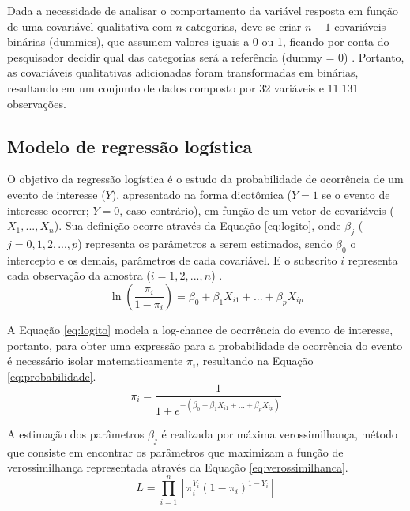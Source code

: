 \documentclass[twocolumn]{rbef}
\newcommand{\1}{\mathbbm{1}}
\begin{document}
Dada a necessidade de analisar o comportamento da variável resposta em função de uma covariável qualitativa com \(n\) categorias, deve-se criar \(n-1\) covariáveis binárias (dummies), que assumem valores iguais a 0 ou 1, ficando por conta do pesquisador decidir qual das categorias será a referência (dummy = 0) \cite{Favero2017}. Portanto, as covariáveis qualitativas adicionadas foram transformadas em binárias, resultando em um conjunto de dados composto por 32 variáveis e 11.131 observações.

\hypertarget{modelo-de-regressuxe3o-loguxedstica}{%
\subsection{Modelo de regressão logística}\label{modelo-de-regressuxe3o-loguxedstica}}

O objetivo da regressão logística é o estudo da probabilidade de ocorrência de um evento de interesse (\(Y\)), apresentado na forma dicotômica (\(Y=1\) se o evento de interesse ocorrer; \(Y=0\), caso contrário), em função de um vetor de covariáveis (\(X_1, ..., X_n\)). Sua definição ocorre através da Equação \eqref{eq:logito}, onde \(\beta_j\) (\(j = 0,1,2,...,p\)) representa os parâmetros a serem estimados, sendo \(\beta_0\) o intercepto e os demais, parâmetros de cada covariável. E o subscrito \(i\) representa cada observação da amostra (\(i = 1, 2,...,n\)) \cite{Favero2017}.
\begin{equation}
\ln \left ( \dfrac{\pi_i}{1-\pi_i} \right ) = \beta_0 + \beta_1 X_{i1} + ... +  \beta_p X_{ip}\label{eq:logito}
\end{equation}

A Equação \eqref{eq:logito} modela a log-chance de ocorrência do evento de interesse, portanto, para obter uma expressão para a probabilidade de ocorrência do evento é necessário isolar matematicamente \(\pi_i\), resultando na Equação \eqref{eq:probabilidade}.
\begin{equation}
\pi_i = \dfrac{1}{1 + e^{-(\beta_0 + \beta_1 X_{i1} + ... +  \beta_p X_{ip})}}\label{eq:probabilidade}
\end{equation}

A estimação dos parâmetros \(\beta_j\) é realizada por máxima verossimilhança, método que consiste em encontrar os parâmetros que maximizam a função de verossimilhança representada através da Equação \eqref{eq:verossimilhanca}.
\begin{equation}
L =  \prod_{i=1}^{n} \left[ \pi_i^{Y_i} (1-\pi_i)^{1-Y_i} \right]\label{eq:verossimilhanca}
\end{equation}
\end{document}
